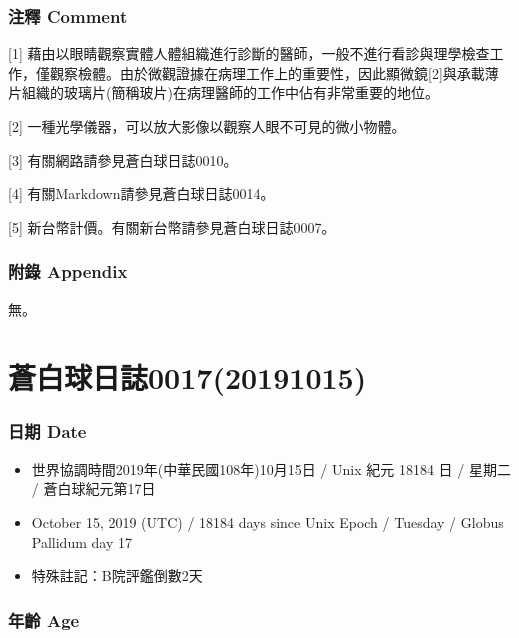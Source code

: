 \documentclass[a5paper, 12pt
]{book}
\providecommand{\tightlist}{%
  \setlength{\itemsep}{0pt}\setlength{\parskip}{0pt}}
\begin{document}
\hypertarget{ux6ce8ux91cb-comment-9}{%
\subsubsection{注釋 Comment}\label{ux6ce8ux91cb-comment-9}}

{[}1{]}
藉由以眼睛觀察實體人體組織進行診斷的醫師，一般不進行看診與理學檢查工作，僅觀察檢體。由於微觀證據在病理工作上的重要性，因此顯微鏡{[}2{]}與承載薄片組織的玻璃片(簡稱玻片)在病理醫師的工作中佔有非常重要的地位。

{[}2{]} 一種光學儀器，可以放大影像以觀察人眼不可見的微小物體。

{[}3{]} 有關網路請參見蒼白球日誌0010。

{[}4{]} 有關Markdown請參見蒼白球日誌0014。

{[}5{]} 新台幣計價。有關新台幣請參見蒼白球日誌0007。

\hypertarget{ux9644ux9304-appendix-8}{%
\subsubsection{附錄 Appendix}\label{ux9644ux9304-appendix-8}}

無。

\hypertarget{ux84bcux767dux7403ux65e5ux8a8c001720191015}{%
\section{蒼白球日誌0017(20191015)}\label{ux84bcux767dux7403ux65e5ux8a8c001720191015}}

\hypertarget{ux65e5ux671f-date-14}{%
\subsubsection{日期 Date}\label{ux65e5ux671f-date-14}}

\begin{itemize}
\tightlist
\item
  世界協調時間2019年(中華民國108年)10月15日 / Unix 紀元 18184 日 /
  星期二 / 蒼白球紀元第17日
\item
  October 15, 2019 (UTC) / 18184 days since Unix Epoch / Tuesday /
  Globus Pallidum day 17
\item
  特殊註記：B院評鑑倒數2天
\end{itemize}

\hypertarget{ux5e74ux9f61-age-14}{%
\subsubsection{年齡 Age}\label{ux5e74ux9f61-age-14}}
\end{document}
